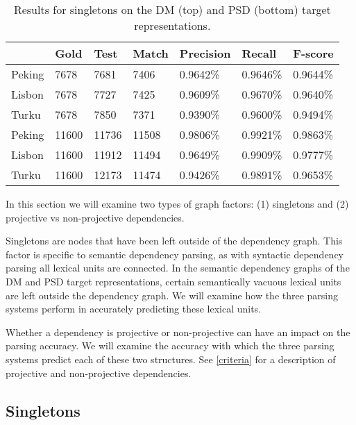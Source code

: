 \begin{table}
    \centering
    \smaller[0.5]
    \begin{tabular}{@{}lllllll@{}}
        \toprule
        \textbf{ } & \textbf{Gold} & \textbf{Test} & \textbf{Match} & \textbf{Precision} & \textbf{Recall} & \textbf{F-score} \\
        \midrule
        Peking &7678       &7681       &7406       &0.9642\%     &0.9646\%     &0.9644\%    \\
        Lisbon &7678       &7727       &7425       &0.9609\%     &0.9670\%     &0.9640\%    \\
        Turku &7678       &7850       &7371       &0.9390\%    &0.9600\%     &0.9494\%    \\
        \midrule
        Peking &11600      &11736      &11508      &0.9806\%     &0.9921\%     &0.9863\%    \\
        Lisbon &11600      &11912      &11494      &0.9649\%     &0.9909\%     &0.9777\%    \\
        Turku &11600      &12173      &11474      &0.9426\%     &0.9891\%     &0.9653\%    \\
        \bottomrule
    \end{tabular}
    \caption{Results for singletons on the DM (top) and PSD (bottom) target representations.}
    \label{fig:singletons}
\end{table}

In this section we will examine two types of graph factors: (1) singletons and (2) projective vs non-projective dependencies.

Singletons are nodes that have been left outside of the dependency graph. This factor is specific to semantic dependency parsing, as with syntactic dependency parsing all lexical units are connected. In the semantic dependency graphs of the DM and PSD target representations, certain semantically vacuous lexical units are left outside the dependency graph. We will examine how the three parsing systems perform in accurately predicting these lexical units.

Whether a dependency is projective or non-projective can have an impact on the parsing accuracy. We will examine the accuracy with which the three parsing systems predict each of these two structures. See \ref{criteria} for a description of projective and non-projective dependencies.

\subsection{Singletons}

